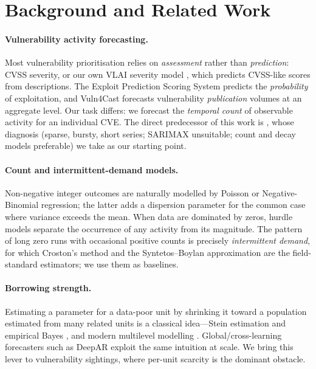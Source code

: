 \documentclass[]{article}
\begin{document}
\section{Background and Related Work}
\paragraph{Vulnerability activity forecasting.} Most vulnerability prioritisation
relies on \emph{assessment} rather than \emph{prediction}: CVSS severity, or our
own VLAI severity model \cite{bonhomme2025vlairobertabasedmodelautomated}, which
predicts CVSS-like scores from descriptions. The Exploit Prediction Scoring System
\cite{jacobs2023enhancingvulnerabilityprioritizationdatadriven} predicts the
\emph{probability} of exploitation, and Vuln4Cast \cite{10.1145/3492328} forecasts
vulnerability \emph{publication} volumes at an aggregate level. Our task differs:
we forecast the \emph{temporal count} of observable activity for an individual
CVE. The direct predecessor of this work is \cite{bonhomme2026modeling}, whose
diagnosis (sparse, bursty, short series; SARIMAX unsuitable; count and decay
models preferable) we take as our starting point.

\paragraph{Count and intermittent-demand models.} Non-negative integer outcomes
are naturally modelled by Poisson or Negative-Binomial regression; the latter adds
a dispersion parameter for the common case where variance exceeds the mean. When
data are dominated by zeros, hurdle models \cite{mullahy1986specification} separate
the occurrence of any activity from its magnitude. The pattern of long zero runs
with occasional positive counts is precisely \emph{intermittent demand}, for which
Croston's method \cite{croston1972forecasting} and the Syntetos--Boylan
approximation \cite{syntetos2005accuracy} are the field-standard estimators; we use
them as baselines.

\paragraph{Borrowing strength.} Estimating a parameter for a data-poor unit by
shrinking it toward a population estimated from many related units is a classical
idea---Stein estimation and empirical Bayes \cite{efron1975data}, and modern
multilevel modelling \cite{gelman2007data}. Global/cross-learning forecasters such
as DeepAR \cite{salinas2020deepar} exploit the same intuition at scale. We bring
this lever to vulnerability sightings, where per-unit scarcity is the dominant
obstacle.
\end{document}
